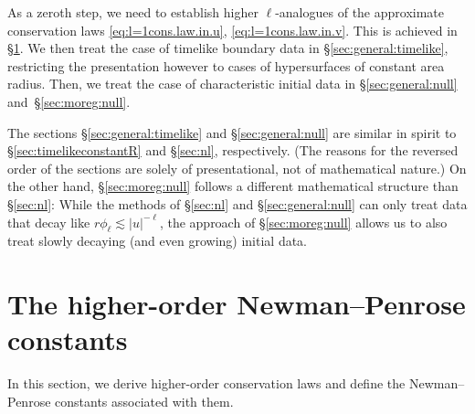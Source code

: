 \documentclass[11pt,english]{article}
\numberwithin{equation}{section}
\theoremstyle{remark}
\theoremstyle{plain}
\theoremstyle{remark}
\renewcommand{\(}{\left(}
\renewcommand{\)}{\right)}
\begin{document}
As a zeroth step, we need to establish higher $\ell$-analogues of the approximate conservation laws \eqref{eq:l=1cons.law.in.u}, \eqref{eq:l=1cons.law.in.v}. 
This is achieved in \S \ref{sec:generalNP}. 
We then treat the case of timelike boundary data in \S \ref{sec:general:timelike}, restricting the presentation however to cases of hypersurfaces of constant area radius.
 Then, we treat the case of characteristic initial data in \S \ref{sec:general:null}  and~\S \ref{sec:moreg:null}. 

The sections \S\ref{sec:general:timelike} and \S\ref{sec:general:null} are similar in spirit to \S\ref{sec:timelikeconstantR} and \S\ref{sec:nl}, respectively. (The reasons for the reversed order of the sections are solely of presentational, not of mathematical nature.)
On the other hand,  \S\ref{sec:moreg:null} follows a different mathematical structure than \S\ref{sec:nl}: While the methods of \S \ref{sec:nl} and \S\ref{sec:general:null} can only treat data that decay like $r\phi_\ell\lesssim|u|^{-\ell}$,  the approach of \S\ref{sec:moreg:null} allows us to also treat slowly decaying (and even growing) initial data.

\section{The higher-order Newman--Penrose constants}\label{sec:generalNP}
In this section, we derive higher-order conservation laws and define the Newman--Penrose constants associated with them. 
\end{document}
